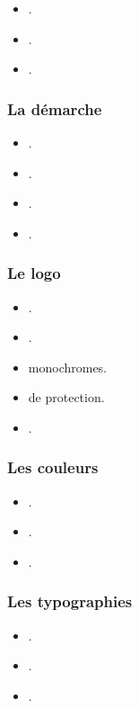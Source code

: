 \begin{itemize}
    \item {}.
    \item {}.
    \item {}.
\end{itemize}

\subsubsection{La démarche}

\begin{itemize}
    \item {}.
    \item {}.
    \item {}.
    \item {}.
\end{itemize}

\subsubsection{Le logo}

\begin{itemize}
    \item {}.
    \item {}.
    \item {} monochromes.
    \item {} de protection.
    \item {}.
\end{itemize}

\subsubsection{Les couleurs}

\begin{itemize}
    \item {}.
    \item {}.
    \item {}.
\end{itemize}

\subsubsection{Les typographies}

\begin{itemize}
    \item {}.
    \item {}.
    \item {}.
\end{itemize}

